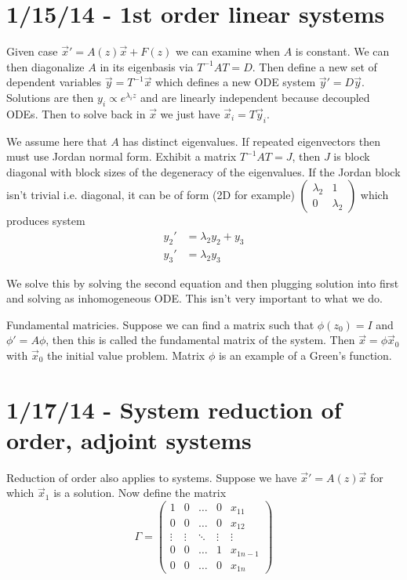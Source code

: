 \documentclass[10pt]{report}
\begin{document}
\chapter{1/15/14 - 1st order linear systems}

Given case $\vec{x}' = A(z)\vec{x} + F(z)$ we can examine when $A$ is constant. We can then diagonalize $A$ in its eigenbasis via $T^{-1}AT = D$. Then define a new set of dependent variables $\vec{y} = T^{-1}\vec{x}$ which defines a new ODE system $\vec{y}' = D\vec{y}$. Solutions are then $y_i \propto e^{\lambda_i z}$ and are linearly independent because decoupled ODEs. Then to solve back in $\vec{x}$ we just have $\vec{x}_i = T\vec{y}_i$. 

We assume here that $A$ has distinct eigenvalues. If repeated eigenvectors then must use Jordan normal form. Exhibit a matrix $T^{-1}AT = J$, then $J$ is block diagonal with block sizes of the degeneracy of the eigenvalues. If the Jordan block isn't trivial i.e. diagonal, it can be of form (2D for example) $\begin{pmatrix} \lambda_2 & 1 \\ 0 & \lambda_2 \end{pmatrix} $ which produces system
\begin{align}
    y_2' &= \lambda_2 y_2 + y_3\\
    y_3' &= \lambda_2 y_3
    \label{1.15.Jordan}
\end{align}

We solve this by solving the second equation and then plugging solution into first and solving as inhomogeneous ODE. This isn't very important to what we do.

Fundamental matricies. Suppose we can find a matrix such that $\phi(z_0) = I$ and $\phi' = A\phi$, then this is called the fundamental matrix of the system. Then $\vec{x} = \phi \vec{x}_0$ with $\vec{x}_0$ the initial value problem. Matrix $\phi$ is an example of a Green's function. 
\chapter{1/17/14 - System reduction of order, adjoint systems}

Reduction of order also applies to systems. Suppose we have $\vec{x}' = A(z)\vec{x}$ for which $\vec{x}_1$ is a solution. Now define the matrix
$$\Gamma = \begin{pmatrix} 1 & 0 & \dots & 0 & x_{11}\\0 & 0 & \dots & 0 & x_{12} \\\vdots & \vdots & \ddots & \vdots & \vdots\\0 & 0 &\dots & 1 & x_{1n-1}\\0 & 0 &\dots & 0 & x_{1n} \end{pmatrix} $$
\end{document}
